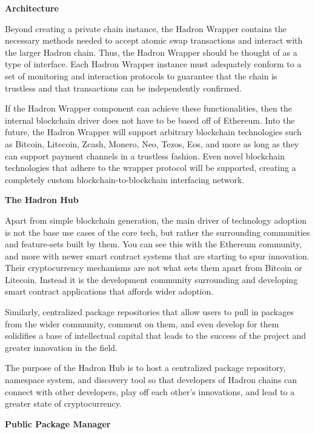 \documentclass{article}
\begin{document}
\begin{center}
\textbf{Architecture}
\end{center}

Beyond creating a private chain instance, the Hadron Wrapper contains the necessary methods needed to accept atomic swap transactions and interact with the larger Hadron chain. Thus, the Hadron Wrapper should be thought of as a type of interface. Each Hadron Wrapper instance must adequately conform to a set of monitoring and interaction protocols to guarantee that the chain is trustless and that transactions can be independently confirmed.

If the Hadron Wrapper component can achieve these functionalities, then the internal blockchain driver does not have to be based off of Ethereum. Into the future, the Hadron Wrapper will support arbitrary blockchain technologies such as Bitcoin, Litecoin, Zcash, Monero, Neo, Tezos, Eos, and more as long as they can support payment channels in a trustless fashion. Even novel blockchain technologies that adhere to the wrapper protocol will be supported, creating a completely custom blockchain-to-blockchain interfacing network.

\begin{center}
\textbf{The Hadron Hub}
\end{center}

Apart from simple blockchain generation, the main driver of technology adoption is not the base use cases of the core tech, but rather the surrounding communities and feature-sets built by them. You can see this with the Ethereum community, and more with newer smart contract systems that are starting to spur innovation. Their cryptocurrency mechanisms are not what sets them apart from Bitcoin or Litecoin. Instead it is the development community surrounding and developing smart contract applications that affords wider adoption.

Similarly, centralized package repositories that allow users to pull in packages from the wider community, comment on them, and even develop for them solidifies a base of intellectual capital that leads to the success of the project and greater innovation in the field.

The purpose of the Hadron Hub is to host a centralized package repository, namespace system, and discovery tool so that developers of Hadron chains can connect with other developers, play off each other's innovations, and lead to a greater state of cryptocurrency.

\begin{center}
\textbf{Public Package Manager}
\end{center}
\end{document}
